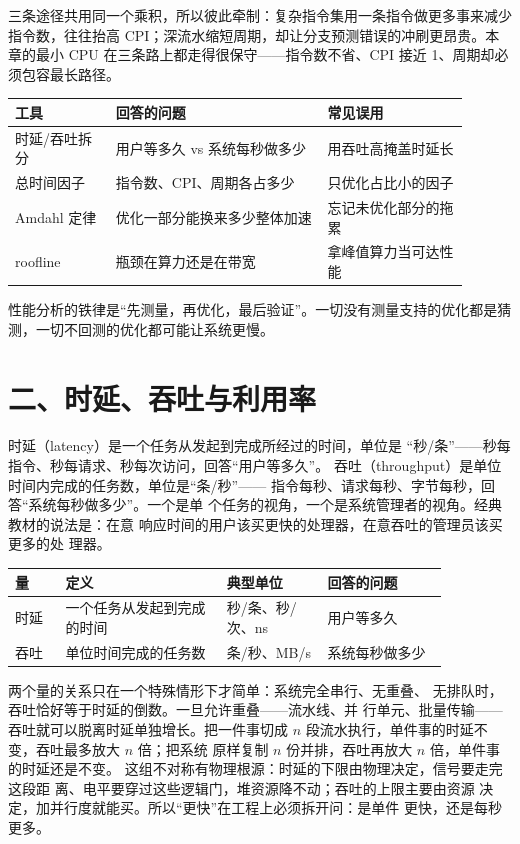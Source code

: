 三条途径共用同一个乘积，所以彼此牵制：复杂指令集用一条指令做更多事来减少指令数，往往抬高 CPI；深流水缩短周期，却让分支预测错误的冲刷更昂贵。本章的最小 CPU 在三条路上都走得很保守——指令数不省、CPI 接近 1、周期却必须包容最长路径。

\begin{longtable}{L{0.2\linewidth}L{0.42\linewidth}L{0.28\linewidth}}
\toprule
工具 & 回答的问题 & 常见误用 \\
\midrule
时延/吞吐拆分 & 用户等多久 vs 系统每秒做多少 & 用吞吐高掩盖时延长 \\\tablerowrule
总时间因子 & 指令数、CPI、周期各占多少 & 只优化占比小的因子 \\\tablerowrule
Amdahl 定律 & 优化一部分能换来多少整体加速 & 忘记未优化部分的拖累 \\\tablerowrule
roofline & 瓶颈在算力还是在带宽 & 拿峰值算力当可达性能 \\
\bottomrule
\end{longtable}

\begin{keyidea}
性能分析的铁律是“先测量，再优化，最后验证”。一切没有测量支持的优化都是猜测，一切不回测的优化都可能让系统更慢。
\end{keyidea}

\section{二、时延、吞吐与利用率}

时延（latency）是一个任务从发起到完成所经过的时间，单位是
“秒/条”——秒每指令、秒每请求、秒每次访问，回答“用户等多久”。
吞吐（throughput）是单位时间内完成的任务数，单位是“条/秒”——
指令每秒、请求每秒、字节每秒，回答“系统每秒做多少”。一个是单
个任务的视角，一个是系统管理者的视角。经典教材的说法是：在意
响应时间的用户该买更快的处理器，在意吞吐的管理员该买更多的处
理器。

\begin{longtable}{L{0.1\linewidth}L{0.32\linewidth}L{0.2\linewidth}L{0.24\linewidth}}
\toprule
量 & 定义 & 典型单位 & 回答的问题 \\
\midrule
时延 & 一个任务从发起到完成的时间 & 秒/条、秒/次、ns & 用户等多久 \\\tablerowrule
吞吐 & 单位时间完成的任务数 & 条/秒、MB/s & 系统每秒做多少 \\
\bottomrule
\end{longtable}

两个量的关系只在一个特殊情形下才简单：系统完全串行、无重叠、
无排队时，吞吐恰好等于时延的倒数。一旦允许重叠——流水线、并
行单元、批量传输——吞吐就可以脱离时延单独增长。把一件事切成
$n$ 段流水执行，单件事的时延不变，吞吐最多放大 $n$ 倍；把系统
原样复制 $n$ 份并排，吞吐再放大 $n$ 倍，单件事的时延还是不变。
这组不对称有物理根源：时延的下限由物理决定，信号要走完这段距
离、电平要穿过这些逻辑门，堆资源降不动；吞吐的上限主要由资源
决定，加并行度就能买。所以“更快”在工程上必须拆开问：是单件
更快，还是每秒更多。


